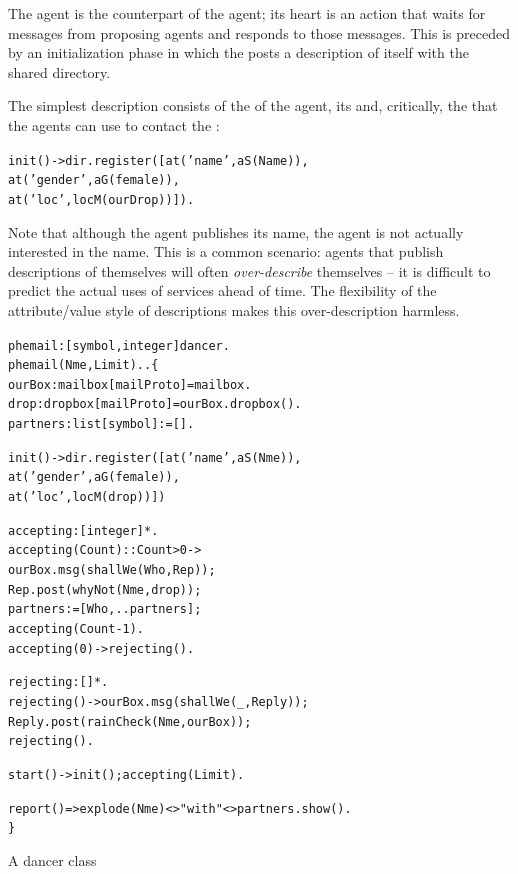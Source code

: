 The \phemail agent is the counterpart of the \mail agent; its heart is an action that waits for  messages from proposing \mail agents and responds to those messages. This is preceded by an initialization phase in which the \phemail posts a description of itself with the shared directory.

The simplest description consists of the  of the agent, its  and, critically, the  that the \mail agents can use to contact the \phemail:
\begin{alltt}
init() -> dir.register([at('name',aS(Name)),
                        at('gender',aG(female)),
                        at('loc',locM(ourDrop))]).
\end{alltt}
Note that although the \phemail agent publishes its name, the \mail agent is not actually interested in the name. This is a common scenario: agents that publish descriptions of themselves will often \emph{over-describe} themselves -- it is difficult to predict the actual uses of services ahead of time. The flexibility of the attribute/value style of descriptions makes this over-description harmless.

\begin{program}[h]
\vspace{0.5ex}
\begin{alltt}
phemail:[symbol,integer]\sconarrow{}dancer.
phemail(Nme,Limit)..\{
  ourBox:mailbox[mailProto] = mailbox.
  drop:dropbox[mailProto] = ourBox.dropbox().
  partners:list[symbol] := [].

  init() -> dir.register([at('name',aS(Nme)),
                          at('gender',aG(female)),
                          at('loc',locM(drop))])
  
  accepting:[integer]*.
  accepting(Count)::Count>0 ->
    ourBox.msg(shallWe(Who,Rep));
    Rep.post(whyNot(Nme,drop));
    partners := [Who,..partners];
    accepting(Count-1).
  accepting(0) -> rejecting().

  rejecting:[]*.
  rejecting() -> ourBox.msg(shallWe(_,Reply));
    Reply.post(rainCheck(Nme,ourBox));
    rejecting().

  start() -> init(); accepting(Limit).

  report() => explode(Nme)<>" with "<>partners.show().
\}
\end{alltt}
\vspace{-2ex}
\caption{A \phemail dancer class}
\label{dancer:phemail}
\end{program}

